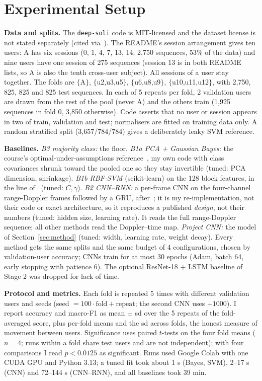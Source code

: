 \documentclass[11pt]{article}
\begin{document}
\section{Experimental Setup}\label{sec:setup}
\textbf{Data and splits.} The \texttt{deep-soli} code is MIT-licensed and the dataset license is not stated separately (cited via~\citet{wang2016soli}). The README's session arrangement gives ten users: A has six sessions (0, 1, 4, 7, 13, 14; 2{,}750 sequences, 53\% of the data) and nine users have one session of 275 sequences (session 13 is in both README lists, so A is also the tenth cross-user subject). All sessions of a user stay together. The folds are $\{$A$\}$, $\{$u2,u3,u5$\}$, $\{$u6,u8,u9$\}$, $\{$u10,u11,u12$\}$, with 2{,}750, 825, 825 and 825 test sequences. In each of 5 repeats per fold, 2 validation users are drawn from the rest of the pool (never A) and the others train (1{,}925 sequences in fold 0, 3{,}850 otherwise). Code asserts that no user or session appears in two of train, validation and test; normalisers are fitted on training data only. A random stratified split (3{,}657/784/784) gives a deliberately leaky SVM reference.

\textbf{Baselines.} \emph{B3 majority class:} the floor. \emph{B1a PCA + Gaussian Bayes:} the course's optimal-under-assumptions reference~\citep{duda2001pattern}, my own code with class covariances shrunk toward the pooled one so they stay invertible (tuned: PCA dimension, shrinkage). \emph{B1b RBF-SVM} (scikit-learn) on the 128 block features, in the line of~\citet{kim2009activity} (tuned: $C,\gamma$). \emph{B2 CNN--RNN:} a per-frame CNN on the four-channel range-Doppler frames followed by a GRU, after~\citet{wang2016soli}; it is my re-implementation, not their code or exact architecture, so it reproduces a published \emph{design}, not their numbers (tuned: hidden size, learning rate). It reads the full range-Doppler sequence; all other methods read the Doppler--time map. \emph{Project CNN:} the model of Section~\ref{sec:method} (tuned: width, learning rate, weight decay). Every method gets the same splits and the same budget of 4 configurations, chosen by validation-user accuracy; CNNs train for at most 30 epochs (Adam, batch 64, early stopping with patience 6). The optional ResNet-18 + LSTM baseline of Stage 2 was dropped for lack of time.

\textbf{Protocol and metrics.} Each fold is repeated 5 times with different validation users and seeds (seed $=100\cdot\text{fold}+\text{repeat}$; the second CNN uses $+1000$). I report accuracy and macro-F1 as mean $\pm$ sd over the 5 repeats of the fold-averaged score, plus per-fold means and the sd across folds, the honest measure of movement between users. Significance uses paired $t$-tests on the four fold means ($n=4$; runs within a fold share test users and are not independent); with four comparisons I read $p<0.0125$ as significant. Runs used Google Colab with one CUDA GPU and Python 3.13; a tuned fit took about 1 s (Bayes, SVM), 2--17 s (CNN) and 72--144 s (CNN--RNN), and all baselines took 39 min.
\end{document}
